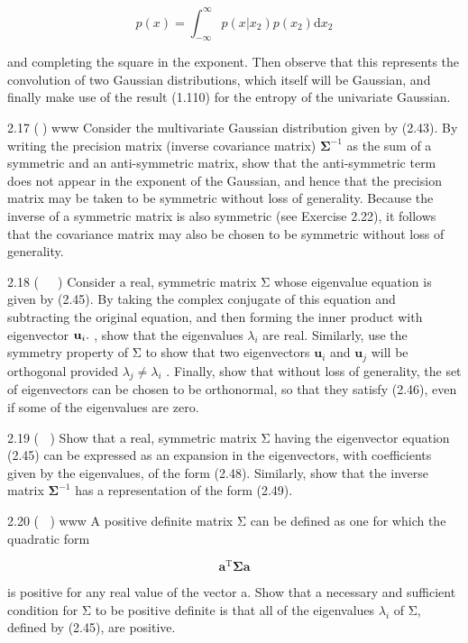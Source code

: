 \documentclass[
  10
]{article}
\begin{document}
\[
p (x) = \int_ {- \infty} ^ {\infty} p (x | x _ {2}) p (x _ {2}) \mathrm{d} x _ {2}\tag{2.284}
\]

and completing the square in the exponent. Then observe that this
represents the convolution of two Gaussian distributions, which itself
will be Gaussian, and finally make use of the result (1.110) for the
entropy of the univariate Gaussian.

2.17 () www Consider the multivariate Gaussian distribution given by
(2.43). By writing the precision matrix (inverse covariance matrix)
\(\pmb { \Sigma } ^ { - 1 }\) as the sum of a symmetric and an
anti-symmetric matrix, show that the anti-symmetric term does not appear
in the exponent of the Gaussian, and hence that the precision matrix may
be taken to be symmetric without loss of generality. Because the inverse
of a symmetric matrix is also symmetric (see Exercise 2.22), it follows
that the covariance matrix may also be chosen to be symmetric without
loss of generality.

2.18 (  ) Consider a real, symmetric matrix Σ whose eigenvalue equation
is given by (2.45). By taking the complex conjugate of this equation and
subtracting the original equation, and then forming the inner product
with eigenvector \({ \bf { u } } _ { i } .\) , show that the eigenvalues
\(\lambda _ { i }\) are real. Similarly, use the symmetry property of Σ
to show that two eigenvectors \(\mathbf { u } _ { i }\) and
\(\mathbf { u } _ { j }\) will be orthogonal provided
\(\lambda _ { j } \neq \lambda _ { i }\) . Finally, show that without
loss of generality, the set of eigenvectors can be chosen to be
orthonormal, so that they satisfy (2.46), even if some of the
eigenvalues are zero.

2.19 ( ) Show that a real, symmetric matrix Σ having the eigenvector
equation (2.45) can be expressed as an expansion in the eigenvectors,
with coefficients given by the eigenvalues, of the form (2.48).
Similarly, show that the inverse matrix \(\pmb { \Sigma } ^ { - 1 }\)
has a representation of the form (2.49).

2.20 ( ) www A positive definite matrix Σ can be defined as one for
which the quadratic form

\[
\mathbf {a} ^ {\mathrm{T}} \boldsymbol {\Sigma} \mathbf {a}\tag{2.285}
\]

is positive for any real value of the vector a. Show that a necessary
and sufficient condition for Σ to be positive definite is that all of
the eigenvalues \(\lambda _ { i }\) of Σ, defined by (2.45), are
positive.
\end{document}
